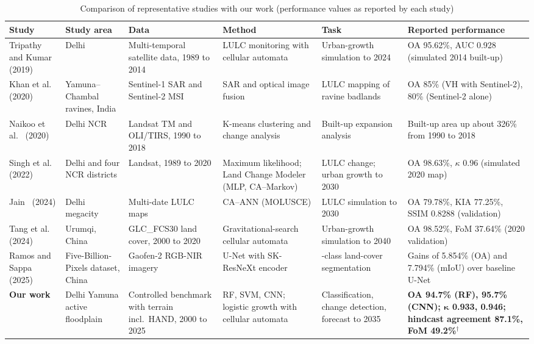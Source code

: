 \documentclass[journal]{IEEEtran}
\begin{document}
\begin{table}[!t]
\caption{Comparison of representative studies with our work (performance values as reported by each study)}
\label{tab:related}
\centering
\footnotesize
\setlength{\tabcolsep}{4pt}
\renewcommand{\arraystretch}{1.22}
\begin{tabular}{@{}>{\raggedright\arraybackslash}p{2.45cm}>{\raggedright\arraybackslash}p{2.2cm}>{\raggedright\arraybackslash}p{2.6cm}>{\raggedright\arraybackslash}p{2.85cm}>{\raggedright\arraybackslash}p{2.55cm}>{\raggedright\arraybackslash}p{3.75cm}@{}}
\toprule
\textbf{Study} & \textbf{Study area} & \textbf{Data} & \textbf{Method} & \textbf{Task} & \textbf{Reported performance} \\
\midrule
Tripathy and Kumar~\cite{tripathy2019monitoring} (2019) & Delhi & Multi-temporal satellite data, 1989 to 2014 & LULC monitoring with cellular automata & Urban-growth simulation to 2024 & OA 95.62\%, AUC 0.928 (simulated 2014 built-up) \\
Khan et al.~\cite{khan2020sentinel} (2020) & Yamuna--Chambal ravines, India & Sentinel-1 SAR and Sentinel-2 MSI & SAR and optical image fusion & LULC mapping of ravine badlands & OA 85\% (VH with Sentinel-2), 80\% (Sentinel-2 alone) \\
Naikoo et al.~\cite{naikoo2020land} (2020) & Delhi NCR & Landsat TM and OLI/TIRS, 1990 to 2018 & K-means clustering and change analysis & Built-up expansion analysis & Built-up area up about 326\% from 1990 to 2018 \\
Singh et al.~\cite{singh2022land} (2022) & Delhi and four NCR districts & Landsat, 1989 to 2020 & Maximum likelihood; Land Change Modeler (MLP, CA--Markov) & LULC change; urban growth to 2030 & OA 98.63\%, $\kappa$ 0.96 (simulated 2020 map) \\
Jain~\cite{jain2024future} (2024) & Delhi megacity & Multi-date LULC maps & CA--ANN (MOLUSCE) & LULC simulation to 2030 & OA 79.78\%, KIA 77.25\%, SSIM 0.8288 (validation) \\
Tang et al.~\cite{tang2024urban} (2024) & Urumqi, China & GLC\_FCS30 land cover, 2000 to 2020 & Gravitational-search cellular automata & Urban-growth simulation to 2040 & OA 98.52\%, FoM 37.64\% (2020 validation) \\
Ramos and Sappa~\cite{ramos2025unet} (2025) & Five-Billion-Pixels dataset, China & Gaofen-2 RGB-NIR imagery & U-Net with SK-ResNeXt encoder & 24-class land-cover segmentation & Gains of 5.854\% (OA) and 7.794\% (mIoU) over baseline U-Net \\
\midrule
\rowcolor{gray!12}\textbf{Our work} & Delhi Yamuna active floodplain & Controlled benchmark with terrain incl.\ HAND, 2000 to 2025 & RF, SVM, CNN; logistic growth with cellular automata & Classification, change detection, forecast to 2035 & \textbf{OA 94.7\% (RF), 95.7\% (CNN); $\boldsymbol{\kappa}$ 0.933, 0.946; hindcast agreement 87.1\%, FoM 49.2\%}$^{\dagger}$ \\
\bottomrule
\end{tabular}


\end{table}
\end{document}
